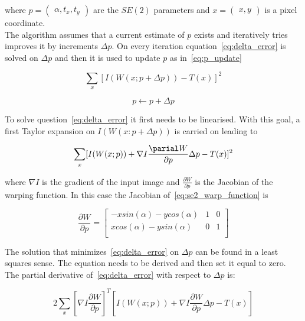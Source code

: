 where $p = \begin{pmatrix} \alpha , t_x , t_y \end{pmatrix}$ are the $SE(2)$ parameters and $x = \begin{pmatrix} x , y \end{pmatrix}$ is a pixel coordinate.\\

  The algorithm assumes that a current estimate of $p$ exists and iteratively tries improves it by increments $\Delta p$. On every  iteration equation~\ref{eq:delta_error} is solved on $\Delta p$ and then it is used to update $p$ as in~\ref{eq:p_update}

\begin{equation}
  \sum_x [I(W(x;p + \Delta p)) - T(x)]^2
  \label{eq:delta_error}
\end{equation}

\begin{equation}
  p \leftarrow p + \Delta p
  \label{eq:p_update}
\end{equation}

To solve question~\ref{eq:delta_error}  it first needs to be linearised. With this goal, a first Taylor expansion on $I(W(x:p + \Delta p))$ is carried on leading to

\begin{equation}
\sum_x [I(W(x;p)) + \nabla I \frac{\parial W}{\partial p} \Delta p - T(x)]^2
\end{equation}

where $\nabla I$ is the gradient of the input image and $\frac{\partial W}{\partial p}$ is the Jacobian of the warping function. In this case the Jacobian of~\ref{eq:se2_warp_function} is

\begin{equation}
  \frac{\partial W}{\partial p}
  =
  \begin{bmatrix}
    -xsin(\alpha) - ycos(\alpha) & 1 & 0 \\
    xcos(\alpha) - ysin(\alpha) & 0 & 1 \\
  \end{bmatrix}
  \label{eq:se2_jac}
\end{equation}


The solution that minimizes~\ref{eq:delta_error}  on $\Delta p$ can be found in a least squares sense. The equation needs to be derived and then set it equal to zero. The partial derivative of~\ref{eq:delta_error} with respect to $\Delta p$ is:

\begin{equation}
  2 \sum_x \left[\nabla I \frac{\partial W}{\partial p}\right]^T \left[I(W(x;p)) + \nabla I \frac{\partial W}{\partial p} \Delta p - T(x) \right]
  \label{eq:derivated}
\end{equation}


